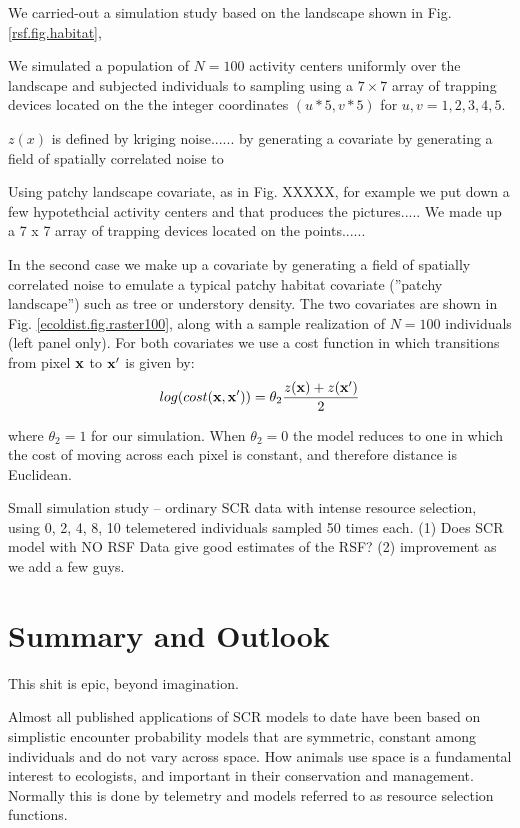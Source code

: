 We carried-out a simulation study based on the landscape
shown in  Fig. \ref{rsf.fig.habitat},

We simulated a population of $N=100$ activity centers uniformly over
the landscape and subjected individuals to sampling using 
a $7 \times 7$ array of trapping devices located on the 
the integer coordinates 
$(u*5,v*5)$ for $u,v = 1,2,3,4,5$.

 $z(x)$ is defined by kriging noise......
by generating a covariate by generating a field of spatially correlated noise to

Using patchy landscape covariate, as in Fig. XXXXX, for example we put
down a few hypotethcial activity centers and that produces the pictures.....
We made up a 7 x 7 array of trapping devices located on the points......


 In the second case we make up
a covariate by generating a field of spatially correlated noise to
emulate a typical patchy habitat covariate (''patchy landscape'') such as
tree or understory density. The two covariates are shown in
Fig. \ref{ecoldist.fig.raster100}, along with a sample realization of
$N=100$ individuals (left panel only).  For both covariates we use a
cost function in which transitions from pixel ${\bf x}$ to ${\bf x}'$
is given by:
\[
 log(cost({\bf x},{\bf x}'))=  \theta_2 \frac{z({\bf x}) + z({\bf x}')}{2}
\]

{\flushleft where} $\theta_2 = 1$ for our simulation.
When $\theta_2=0$ the
model reduces to one in which the cost of moving across each pixel is
constant, and therefore distance is Euclidean.

Small simulation study -- ordinary SCR data with intense resource selection,
using 0, 2, 4, 8, 10 telemetered individuals sampled 50 times each.
(1) Does SCR model with NO RSF Data give good estimates of the RSF?
(2) improvement as we add a few guys.


\section{Summary and Outlook}

This shit is epic, beyond imagination.

Almost
all published applications of SCR models to date have been based on
simplistic encounter probability models that are symmetric, constant among
individuals and  do not vary across space. How animals use space is a
fundamental interest to ecologists, and important in their
conservation and management. Normally this is done by telemetry and
models referred to as resource selection functions.

